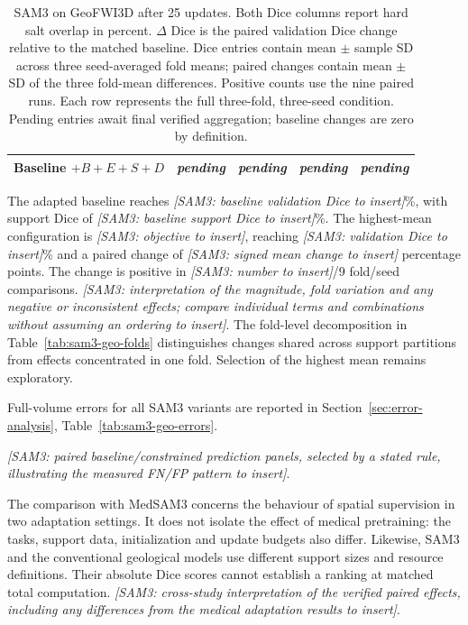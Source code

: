 \documentclass[12pt,a4paper]{article}
\newcommand{\samPending}{\textit{pending}}
\newcommand{\samResult}[1]{\textit{[SAM3: #1 to insert]}}
\begin{document}
\begin{table}[htbp]
\begin{tabular}{@{}lrrrr@{}}
Baseline $+B+E+S+D$ & \samPending & \samPending & \samPending & \samPending \\
\hline
\end{tabular}
\caption{SAM3 on GeoFWI3D after 25 updates. Both Dice columns report
hard salt overlap in percent. $\Delta$ Dice is the paired validation
Dice change relative to the matched baseline. Dice entries contain mean
$\pm$ sample SD across three seed-averaged fold means; paired changes
contain mean $\pm$ SD of the three fold-mean differences. Positive counts
use the nine paired runs. Each row represents the full three-fold,
three-seed condition. Pending entries await final verified aggregation;
baseline changes are zero by definition.}
\label{tab:sam3-geo-results}
\end{table}

The adapted baseline reaches \samResult{baseline validation Dice}\%,
with support Dice of \samResult{baseline support Dice}\%.
The highest-mean configuration is \samResult{objective}, reaching
\samResult{validation Dice}\% and a paired change of
\samResult{signed mean change} percentage points. The change is positive
in \samResult{number}/9 fold/seed comparisons.
\samResult{interpretation of the magnitude, fold variation and any
negative or inconsistent effects; compare individual terms and
combinations without assuming an ordering}.
The fold-level decomposition in Table~\ref{tab:sam3-geo-folds} distinguishes
changes shared across support partitions from effects concentrated in
one fold. Selection of the highest mean remains exploratory.

Full-volume errors for all SAM3 variants are reported in
Section~\ref{sec:error-analysis}, Table~\ref{tab:sam3-geo-errors}.

\noindent\samResult{paired baseline/constrained prediction panels,
selected by a stated rule, illustrating the measured FN/FP pattern}.

The comparison with MedSAM3 concerns the behaviour of spatial supervision
in two adaptation settings. It does not isolate the effect of medical
pretraining: the tasks, support data, initialization and update budgets
also differ. Likewise, SAM3 and the conventional geological models use
different support sizes and resource definitions. Their absolute Dice
scores cannot establish a ranking at matched total computation.
\samResult{cross-study interpretation of the verified paired effects,
including any differences from the medical adaptation results}.
\end{document}
